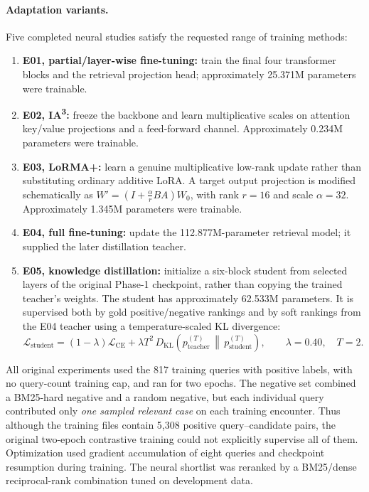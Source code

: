 \paragraph{Adaptation variants.}
Five completed neural studies satisfy the requested range of training methods:
\begin{enumerate}[leftmargin=*,itemsep=2pt]
\item \textbf{E01, partial/layer-wise fine-tuning:} train the final four
transformer blocks and the retrieval projection head; approximately 25.371M
parameters were trainable.
\item \textbf{E02, IA\textsuperscript{3}:} freeze the backbone and learn
multiplicative scales on attention key/value projections and a feed-forward
channel. Approximately 0.234M parameters were trainable.
\item \textbf{E03, LoRMA+:} learn a genuine multiplicative low-rank update
rather than substituting ordinary additive LoRA. A target output projection
is modified schematically as
$W'=(I+\frac{\alpha}{r}BA)W_0$, with rank $r=16$ and
scale $\alpha=32$. Approximately 1.345M parameters were trainable.
\item \textbf{E04, full fine-tuning:} update the 112.877M-parameter retrieval
model; it supplied the later distillation teacher.
\item \textbf{E05, knowledge distillation:} initialize a six-block student
from selected layers of the original Phase-1 checkpoint, rather than copying
the trained teacher's weights. The student has approximately 62.533M parameters.
It is supervised both by gold positive/negative rankings and by soft rankings
from the E04 teacher using a temperature-scaled KL divergence:
\begin{equation}
\mathcal{L}_{\mathrm{student}}
=(1-\lambda)\mathcal{L}_{\mathrm{CE}}
+\lambda T^{2}\,D_{\mathrm{KL}}
\left(p_{\mathrm{teacher}}^{(T)}\,\middle\|\,
 p_{\mathrm{student}}^{(T)}\right),\qquad
\lambda=0.40,\quad T=2.
\end{equation}
\end{enumerate}

All original experiments used the 817 training queries with positive labels,
with no query-count training cap, and ran for two epochs. The negative set
combined a BM25-hard negative and a random negative, but each individual query
contributed only \emph{one sampled relevant case} on each training encounter.
Thus although the training files contain 5,308 positive query--candidate pairs,
the original two-epoch contrastive training could not explicitly supervise
all of them. Optimization used gradient accumulation of eight queries and
checkpoint resumption during training. The neural shortlist was reranked by a
BM25/dense reciprocal-rank combination tuned on development data.

